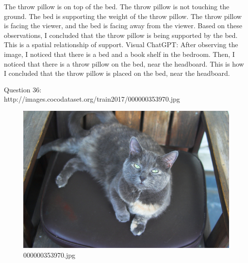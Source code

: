 \begin{enumerate}
        The throw pillow is on top of the bed.
        The throw pillow is not touching the ground.
        The bed is supporting the weight of the throw pillow.
        The throw pillow is facing the viewer, and the bed is facing away from the viewer.
        Based on these observations, I concluded that the throw pillow is being supported by the bed. This is a spatial relationship of support.
        \subitem Visual ChatGPT: After observing the image, I noticed that there is a bed and a book shelf in the bedroom. Then, I noticed that there is a throw pillow on the bed, near the headboard. This is how I concluded that the throw pillow is placed on the bed, near the headboard.
    \end{enumerate}
    Question 36:\\http://images.cocodataset.org/train2017/000000353970.jpg
    \begin{figure}[h]
        \centering
        \includegraphics[width=0.8\linewidth]{../image set/easy/000000353970.jpg}
        \caption{000000353970.jpg}
    \end{figure}
